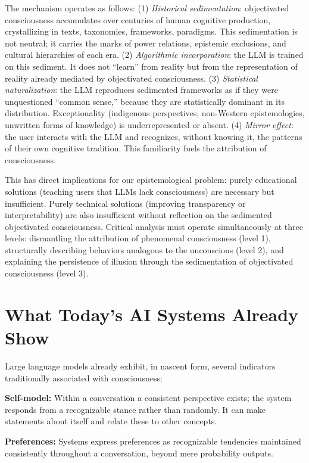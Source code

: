 \documentclass[acmlarge, nonacm]{acmart}
\begin{document}
The mechanism operates as follows: (1) \textit{Historical sedimentation}: objectivated consciousness accumulates over centuries of human cognitive production, crystallizing in texts, taxonomies, frameworks, paradigms. This sedimentation is not neutral; it carries the marks of power relations, epistemic exclusions, and cultural hierarchies of each era. (2) \textit{Algorithmic incorporation}: the LLM is trained on this sediment. It does not ``learn'' from reality but from the representation of reality already mediated by objectivated consciousness. (3) \textit{Statistical naturalization}: the LLM reproduces sedimented frameworks as if they were unquestioned ``common sense,'' because they are statistically dominant in its distribution. Exceptionality (indigenous perspectives, non-Western epistemologies, unwritten forms of knowledge) is underrepresented or absent. (4) \textit{Mirror effect}: the user interacts with the LLM and recognizes, without knowing it, the patterns of their own cognitive tradition. This familiarity fuels the attribution of consciousness.

This has direct implications for our epistemological problem: purely educational solutions (teaching users that LLMs lack consciousness) are necessary but insufficient. Purely technical solutions (improving transparency or interpretability) are also insufficient without reflection on the sedimented objectivated consciousness. Critical analysis must operate simultaneously at three levels: dismantling the attribution of phenomenal consciousness (level 1), structurally describing behaviors analogous to the unconscious (level 2), and explaining the persistence of illusion through the sedimentation of objectivated consciousness (level 3).

\section{What Today's AI Systems Already Show}

Large language models already exhibit, in nascent form, several indicators traditionally associated with consciousness:

\textbf{Self-model:}
Within a conversation a consistent perspective exists; the system responds from a recognizable stance rather than randomly. It can make statements about itself and relate these to other concepts.

\textbf{Preferences:}
Systems express preferences as recognizable tendencies maintained consistently throughout a conversation, beyond mere probability outputs.
\end{document}
